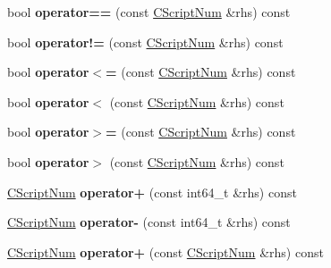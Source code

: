 \begin{DoxyCompactItemize}
bool {\bfseries operator==} (const \mbox{\hyperlink{class_c_script_num}{C\+Script\+Num}} \&rhs) const
\item 
\mbox{\label{class_c_script_num_af46e2ecc25f8a9d1fc8e024e9c8537d2}} 
bool {\bfseries operator!=} (const \mbox{\hyperlink{class_c_script_num}{C\+Script\+Num}} \&rhs) const
\item 
\mbox{\label{class_c_script_num_a5e0e03de0b05f7159b1875b876162b3b}} 
bool {\bfseries operator$<$=} (const \mbox{\hyperlink{class_c_script_num}{C\+Script\+Num}} \&rhs) const
\item 
\mbox{\label{class_c_script_num_a2979a7042ac68a122f971b4b13c66fed}} 
bool {\bfseries operator$<$} (const \mbox{\hyperlink{class_c_script_num}{C\+Script\+Num}} \&rhs) const
\item 
\mbox{\label{class_c_script_num_ad3ee026308eff5c3b3c09e443bfaf3fb}} 
bool {\bfseries operator$>$=} (const \mbox{\hyperlink{class_c_script_num}{C\+Script\+Num}} \&rhs) const
\item 
\mbox{\label{class_c_script_num_a3d8a4d932520620b479a39011c3d752a}} 
bool {\bfseries operator$>$} (const \mbox{\hyperlink{class_c_script_num}{C\+Script\+Num}} \&rhs) const
\item 
\mbox{\label{class_c_script_num_a2b789a4d6c8d318958d247aaca41d51d}} 
\mbox{\hyperlink{class_c_script_num}{C\+Script\+Num}} {\bfseries operator+} (const int64\+\_\+t \&rhs) const
\item 
\mbox{\label{class_c_script_num_a122e2f08776cec4d618762f2de3dca69}} 
\mbox{\hyperlink{class_c_script_num}{C\+Script\+Num}} {\bfseries operator-\/} (const int64\+\_\+t \&rhs) const
\item 
\mbox{\label{class_c_script_num_afaf58e7bed9ca3a86275aea296c6deb8}} 
\mbox{\hyperlink{class_c_script_num}{C\+Script\+Num}} {\bfseries operator+} (const \mbox{\hyperlink{class_c_script_num}{C\+Script\+Num}} \&rhs) const
\item 
\mbox{\label{class_c_script_num_a33a27e144d2e01bec5d3d0f079c9a4ec}} 

\end{DoxyCompactItemize}
